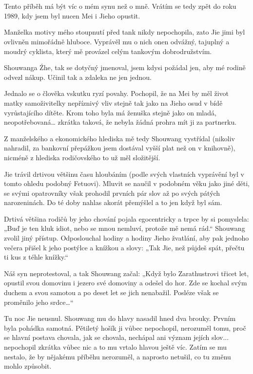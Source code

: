\chapter{}

Tento příběh má být víc o mém synu než o mně. Vrátím se tedy zpět do roku 1989, kdy jsem byl nucen Mei i Jieho opustit.

Manželka motivy mého stoupnutí před tank nikdy nepochopila, zato Jie jimi byl ovlivněn mimořádně hluboce. Vyprávěl mu o nich onen odvážný, tajuplný a moudrý cyklista, který mě provázel celým tankovým dobrodružstvím.

Shouwanga Źhe, tak se dotyčný jmenoval, jsem kdysi požádal jen, aby mé rodině odvezl nákup. Učinil tak a zdaleka ne jen jednou.

Jednalo se o člověka vskutku ryzí povahy. Pochopil, že na Mei by měl život matky samoživitelky nepříznivý vliv stejně tak jako na Jieho osud v bídě vyrůstajícího dítěte. Krom toho byla má ženuška stejně jako on mladá, neopotřebovaná… zkrátka taková, že nebyla žádná prohra mít ji za partnerku. 

Z manželského a ekonomického hlediska mě tedy Shouwang vystřídal (nikoliv nahradil, za bankovní přepážkou jsem dostával vyšší plat než on v knihovně), nicméně z hlediska rodičovského to už měl složitější.

Jie trávil drtivou většinu času hloubáním (podle svých vlastních vyprávění byl v tomto ohledu podobný Fetuovi). Mluvit se naučil v podobném věku jako jiné děti, se svými opatrovníky však prohodil prvních pár slov až po svých pátých narozeninách. Do té doby nahlas akorát přemýšlel a to jen když byl sám.

Drtivá většina rodičů by jeho chování pojala egocentricky a trpce by si pomyslela: „Buď je ten kluk idiot, nebo se mnou nemluví, protože mě nemá rád.“ Shouwang zvolil jiný přístup. Odposlouchal hodiny a hodiny Jieho žvatlání, aby pak jednoho večera přišel k jeho postýlce a knížkou a slovy: „Tak Jie, než půjdeš spát, přečtu ti kus z téhle knížky.“

Náš syn neprotestoval, a tak Shouwang začal: „Když bylo Zarathustrovi třicet let, opustil svou domovinu i jezero své domoviny a odešel do hor. Zde se kochal svým duchem a svou samotou a po deset let se jich nenabažil. Posléze však se proměnilo jeho srdce…“

Tu noc Jie neusnul. Shouwang mu do hlavy nasadil hned dva brouky. Prvním byla pohádka samotná. Pětiletý hošík ji vůbec nepochopil, nerozuměl tomu, proč se hlavní postava chovala, jak se chovala, nechápal ani význam jejích slov... nepochopil zkrátka vůbec nic a to mu vrtalo hlavou ještě víc. Zatím se mu nestalo, že by nějakému příběhu nerozuměl, a naprosto netušil, co tu změnu mohlo způsobit.


